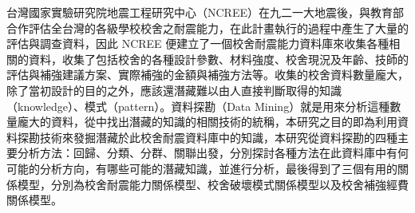 
台灣國家實驗研究院地震工程研究中心（NCREE）在九二一大地震後，與教育部合作評估全台灣的各級學校校舍之耐震能力，在此計畫執行的過程中產生了大量的評估與調查資料，因此 NCREE 便建立了一個校舍耐震能力資料庫來收集各種相關的資料，收集了包括校舍的各種設計參數、材料強度、校舍現況及年齡、技師的評估與補強建議方案、實際補強的金額與補強方法等。收集的校舍資料數量龐大，除了當初設計的目的之外，應該還潛藏難以由人直接判斷取得的知識（knowledge）、模式（pattern）。資料探勘（Data Mining）就是用來分析這種數量龐大的資料，從中找出潛藏的知識的相關技術的統稱，本研究之目的即為利用資料探勘技術來發掘潛藏於此校舍耐震資料庫中的知識，本研究從資料探勘的四種主要分析方法：回歸、分類、分群、關聯出發，分別探討各種方法在此資料庫中有何可能的分析方向，有哪些可能的潛藏知識，並進行分析，最後得到了三個有用的關係模型，分別為校舍耐震能力關係模型、校舍破壞模式關係模型以及校舍補強經費關係模型。
	